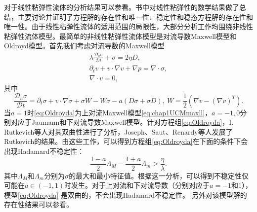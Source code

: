 对于线性粘弹性流体的分析结果可以参看\cite{fabrizio1992mathematical,renardy2000mathematical}。书中对线性粘弹性的数学结果做了总结，主要讨论并证明了方程解的存在性和唯一性、稳定性和稳态方程解的存在性和唯一性。由于线性粘弹性流体的适用范围的局限性，大部分分析工作均围绕非线性粘弹性流体模型。最简单的非线性粘弹性流体模型是对流导数Maxwell模型和Oldroyd模型。首先我们考虑对流导数的Maxwell模型
\begin{subequations}\label{eq:Oldroyda}
\begin{align}
	\lambda \frac{\mathcal{D}_a \sigma}{\mathcal{D} t} + \sigma = 2 \eta D, \\
	\partial_t v + v \cdot \nabla v  + \nabla p = \nabla \cdot \sigma, \\
	\nabla \cdot v = 0,
\end{align}
\end{subequations}
其中
\begin{equation*}%
	\frac{\mathcal{D}_a \sigma}{\mathcal{D} t} = \partial_t \sigma + v \cdot \nabla \sigma + \sigma W- W \sigma - a(D \sigma + \sigma D), \ W = \frac{1}{2}(\nabla v - (\nabla v)^T).
\end{equation*}
当$a=1$时\eqref{eq:Oldroyda}为上对流Maxwell模型\eqref{eq:chap1UCMmaxll}，$a=-1,0$分别对应于Jaumann和下对流导数Maxwell模型。针对方程组\eqref{eq:Oldroyda}，I. Rutkevich等人对其双曲性进行了分析\cite{rutkevich1969some,rutkevich1970propagation}，Joseph、Saut、Renardy等人发展了Rutkevich的结果\cite{joseph1987hyperbolicity,joseph1986change}。由这些工作，可以得到方程组\eqref{eq:Oldroyda}在下面的条件下会出现Hadamard不稳定性：
\begin{equation*}
	\frac{1-a}{2} \Lambda_M - \frac{1+a}{2} \Lambda_m > \frac{\eta}{\lambda}.
\end{equation*}
其中$\Lambda_M$和$\Lambda_m$分别为$\sigma$的最大和最小特征值。根据这一分析，可以得到不稳定性仅可能在$a\in (-1,1)$时发生。对于上对流和下对流导数（分别对应于$a=-1$和$1$），模型\eqref{eq:Oldroyda}
是双曲的，不会出现Hadamard不稳定性。
另外对该模型解的存在性结果可以参看\cite{saut2012lectures}。

